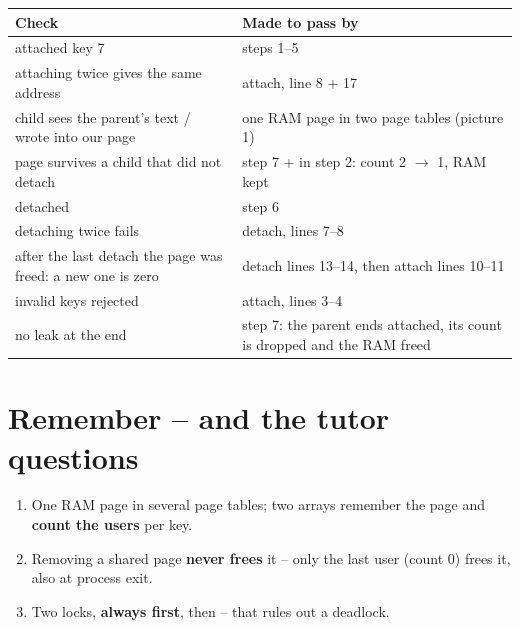 \documentclass[11pt]{report}
\begin{document}
{\small
\begin{tabular}{@{}L{6.8cm} L{8.4cm}@{}}
\toprule
\textbf{Check} & \textbf{Made to pass by}\\\midrule
attached key 7 & steps 1--5\\
attaching twice gives the same address & attach, line 8 + 17\\
child sees the parent's text / wrote into our page & one RAM page in two page tables (picture 1)\\
page survives a child that did not detach & step 7 +  in step 2: count 2 $\to$ 1, RAM kept\\
detached & step 6\\
detaching twice fails & detach, lines 7--8\\
after the last detach the page was freed: a new one is zero & detach lines 13--14, then attach lines 10--11\\
invalid keys rejected & attach, lines 3--4\\
no leak at the end & step 7: the parent ends attached, its count is dropped and the RAM freed\\
\bottomrule
\end{tabular}}

\section*{Remember -- and the tutor questions}

\begin{keybox}[title={Three sentences}]
\begin{enumerate}
  \item One RAM page in several page tables; two arrays remember the page and \textbf{count the users} per key.
  \item Removing a shared page \textbf{never frees} it -- only the last user (count 0) frees it, also at process exit.
  \item Two locks, \textbf{always  first}, then  -- that rules out a deadlock.
\end{enumerate}
\end{keybox}
\end{document}
